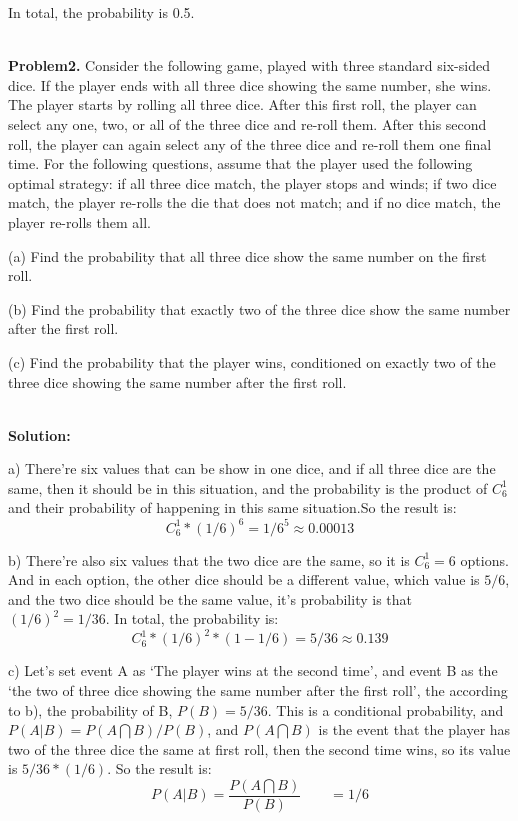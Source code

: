 \documentclass{article}
\begin{document}
In total, the probability is 0.5.
 

~\\


\noindent \textbf{Problem2.} Consider the following game, played with three standard six-sided dice. If the player ends
with all three dice showing the same number, she wins. The player starts by rolling all three dice. After
this first roll, the player can select any one, two, or all of the three dice and re-roll them. After this second
roll, the player can again select any of the three dice and re-roll them one final time. For the following
questions, assume that the player used the following optimal strategy: if all three dice match, the player
stops and winds; if two dice match, the player re-rolls the die that does not match; and if no dice match,
the player re-rolls them all.

(a) Find the probability that all three dice show the same number on the first roll.

(b) Find the probability that exactly two of the three dice show the same number after the first roll.

(c) Find the probability that the player wins, conditioned on exactly two of the three dice showing the
same number after the first roll.
 
~\\

\noindent \textbf{Solution:}

a) There're six values that can be show in one dice, and if all three dice are the same, then it should be in this situation, and the probability is the product of $C_6^1$ and their probability of happening in this same situation.So the result is:
$$ C_6^1 * (1/6)^6 = 1 / 6^5 \approx 0.00013$$ 
 
b) There're also six values that the two dice are the same, so it is $C_6^1 = 6$ options. And in each option, the other dice should be a different value, which value is $5/6$, and the two dice should be the same value, it's probability is that $(1/6)^2 = 1/36$. In total, the probability is:
$$ C_6^1 * (1/6)^2 * (1 - 1/6) = 5/36 \approx 0.139$$

c) Let's set event A as `The player wins at the second time', and event B as the `the two of three dice showing the same number after the first roll', the according to b), the probability of B, $P(B) = 5/36$. This is a conditional probability, and $P(A|B) = P(A \bigcap B) / P(B)$, and $P(A \bigcap B)$ is the event that the player has two of the three dice the same at first roll, then the second time wins, so its value is $5/36 * (1/6)$. So the result is:
$$P(A|B) = \frac{P(A \bigcap B)}{P(B)}\qquad = 1/6$$
\end{document}
